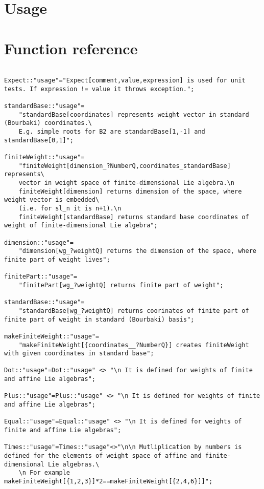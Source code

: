 \documentclass[preprint,12pt]{article}
\begin{document}
\section{Usage}
\label{sec:usage}



\section{Function reference}
\label{sec:reference}
\begin{lstlisting}
  
Expect::"usage"="Expect[comment,value,expression] is used for unit tests. If expression != value it throws exception.";

standardBase::"usage"=
    "standardBase[coordinates] represents weight vector in standard (Bourbaki) coordinates.\
    E.g. simple roots for B2 are standardBase[1,-1] and standardBase[0,1]";

finiteWeight::"usage"=
    "finiteWeight[dimension_?NumberQ,coordinates_standardBase] represents\ 
    vector in weight space of finite-dimensional Lie algebra.\n 
    finiteWeight[dimension] returns dimension of the space, where weight vector is embedded\ 
    (i.e. for sl_n it is n+1).\n 
    finiteWeight[standardBase] returns standard base coordinates of weight of finite-dimensional Lie algebra";

dimension::"usage"=
    "dimension[wg_?weightQ] returns the dimension of the space, where finite part of weight lives";

finitePart::"usage"=
    "finitePart[wg_?weightQ] returns finite part of weight";

standardBase::"usage"=
    "standardBase[wg_?weightQ] returns coorinates of finite part of finite part of weight in standard (Bourbaki) basis";

makeFiniteWeight::"usage"=
    "makeFiniteWeight[{coordinates__?NumberQ}] creates finiteWeight with given coordinates in standard base";

Dot::"usage"=Dot::"usage" <> "\n It is defined for weights of finite and affine Lie algebras";

Plus::"usage"=Plus::"usage" <> "\n It is defined for weights of finite and affine Lie algebras";

Equal::"usage"=Equal::"usage" <> "\n It is defined for weights of finite and affine Lie algebras";

Times::"usage"=Times::"usage"<>"\n\n Mutliplication by numbers is defined for the elements of weight space of affine and finite-dimensional Lie algebras.\ 
    \n For example makeFiniteWeight[{1,2,3}]*2==makeFiniteWeight[{2,4,6}]]";


\end{lstlisting}
\end{document}
